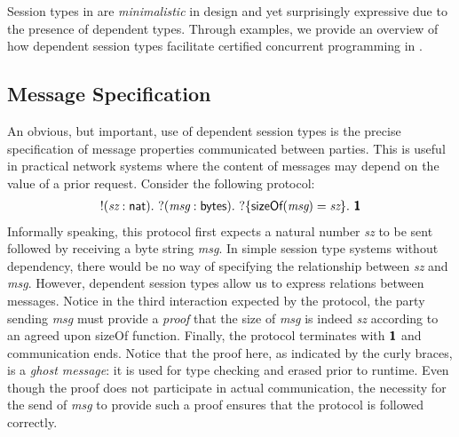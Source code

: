 Session types in \TLLC{} are \emph{minimalistic} in design and yet surprisingly expressive
due to the presence of dependent types. Through examples, we provide an overview of
how dependent session types facilitate certified concurrent programming in \TLLC{}.

\subsection{Message Specification}
An obvious, but important, use of dependent session types is the precise specification
of message properties communicated between parties. This is useful in practical network
systems where the content of messages may depend on the value of a prior request.
Consider the following protocol:
\begin{align*}
  !(\textit{sz}: \textsf{nat}).\
  ?(\textit{msg}: \textsf{bytes}).\ ?\{\textsf{sizeOf}(\textit{msg}) = \textit{sz}\}.\ \textbf{\textsf{1}}
\end{align*}
Informally speaking, this protocol first expects a natural number \textit{sz} to be sent
followed by receiving a byte string \textit{msg}. In simple session type systems without
dependency, there would be no way of specifying the relationship between \textit{sz} and
\textit{msg}. However, dependent session types allow us to express relations between messages.
Notice in the third interaction expected by the protocol, the party sending \textit{msg} must
provide a \emph{proof} that the size of \textit{msg} is indeed \textit{sz} according to
an agreed upon \textsf{sizeOf} function. Finally, the protocol terminates with $\textbf{\textsf{1}}$ and
communication ends. Notice that the proof here, as indicated by the curly braces, is a
\emph{ghost message}: it is used for type checking and erased prior to runtime. Even though
the proof does not participate in actual communication, the necessity for the send of
\textit{msg} to provide such a proof ensures that the protocol is followed correctly.

